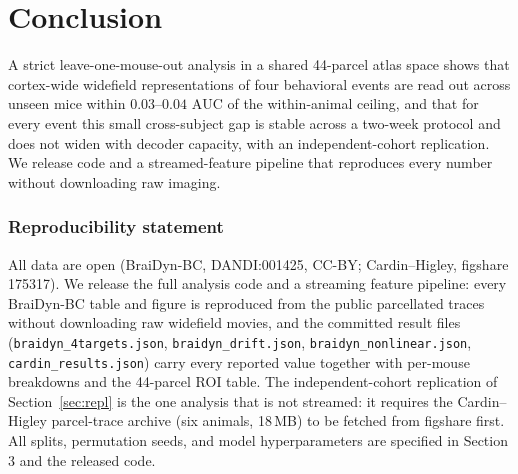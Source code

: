 \documentclass{article}
\newcommand{\auc}{\mathrm{AUC}}
\begin{document}
\section{Conclusion}
A strict leave-one-mouse-out analysis in a shared 44-parcel atlas space shows that cortex-wide
widefield representations of four behavioral events are read out across unseen mice within
$0.03$--$0.04$ $\auc$ of the within-animal ceiling, and that for every event this small cross-subject
gap is stable across a two-week protocol and does not widen with decoder capacity, with an
independent-cohort replication. We release code and a streamed-feature pipeline that reproduces every number without
downloading raw imaging.

\subsubsection*{Reproducibility statement}
All data are open (BraiDyn-BC, DANDI:001425, CC-BY; Cardin--Higley, figshare 175317). We release
the full analysis code and a streaming feature pipeline: every BraiDyn-BC table and figure is
reproduced from the public parcellated traces without downloading raw widefield movies, and the
committed result files (\texttt{braidyn\_4targets.json}, \texttt{braidyn\_drift.json},
\texttt{braidyn\_nonlinear.json}, \texttt{cardin\_results.json}) carry every reported value
together with per-mouse breakdowns and the 44-parcel ROI table. The independent-cohort
replication of Section~\ref{sec:repl} is the one analysis that is not streamed: it requires the
Cardin--Higley parcel-trace archive (six animals, 18\,MB) to be fetched from figshare first. All
splits, permutation seeds, and model hyperparameters are specified in Section 3 and the released
code.
\end{document}
